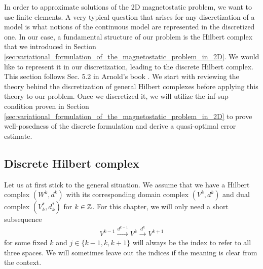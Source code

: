 \documentclass[../master_thesis.tex]{subfiles}
\begin{document}
In order to approximate solutions of the  2D magnetostatic problem, we want to use finite elements.
A very typical question that arises for any discretization of a model is what 
notions of the continuous model are represented in the discretized one. 
In our case, a fundamental structure of our problem is the Hilbert complex that we introduced in Section\,
\ref{sec:variational_formulation_of_the_magnetostatic_problem_in_2D}.
We would like to represent it in our discretization, leading to the discrete Hilbert complex. 
This section follows Sec. 5.2 in Arnold's book \cite{arnold}. We start with reviewing the 
 theory behind the discretization of general Hilbert complexes before applying this 
theory to our problem. Once we discretized it, we will utilize
the inf-sup condition proven in Section\,\ref{sec:variational_formulation_of_the_magnetostatic_problem_in_2D} 
to prove well-posedness of 
the discrete formulation and derive a quasi-optimal error estimate.

\subsection{Discrete Hilbert complex}\label{sec:discrete_hilbert_complex}

Let us at first stick to the general situation. We assume that we have a Hilbert complex 
$(W^k,d^k)$ with its corresponding domain complex 
$(V^k,d^k)$ and dual complex $(V^*_k,d^*_k)$ for $k \in \mathbb{Z}$. For this chapter, 
we will only need a short subsequence 
\begin{align*}
    V^{k-1} \xrightarrow{d^{k-1}} V^k \xrightarrow{d^{k}} V^{k+1}
\end{align*}
for some fixed $k$ and $j \in \{k-1,k,k+1\}$ will always be the index to refer to 
all three spaces. We will sometimes leave out the indices if the meaning is clear from the context.
\end{document}
